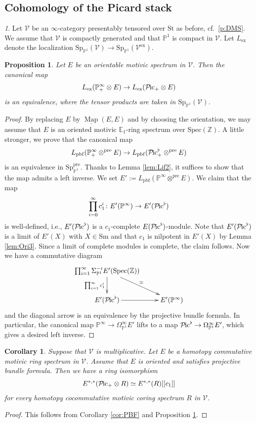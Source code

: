 \documentclass{amsart}
\theoremstyle{plain}
\newtheorem{proposition}[theorem]{Proposition}
\newtheorem{corollary}[theorem]{Corollary}
\theoremstyle{definition}
\theoremstyle{remark}
\newtheorem{p}[theorem]{}
\numberwithin{equation}{theorem}
\newcommand{\mbb}[1]{\mathbb{#1}}
\newcommand{\Sm}{\mathrm{Sm}}
\newcommand{\Spec}{\mathrm{Spec}}
\newcommand{\St}{\mathrm{St}}
\newcommand{\V}{\mathcal{V}}
\newcommand{\ex}{\mathrm{ex}}
\newcommand{\pbf}{\mathrm{pbf}}
\newcommand{\pre}{\mathrm{pre}}
\newcommand{\OmegaP}{\Omega_{\mathbb{P}^1}}
\newcommand{\SigmaP}{\Sigma_{\mathbb{P}^1}}
\newcommand{\SpP}{\mathrm{Sp}_{\mathbb{P}^1}}
\newcommand{\Pic}{{\mathcal{P}\mspace{-2.0mu}\mathrm{ic}}}
\newcommand{\Map}{\operatorname{Map}}
\newcommand{\intMap}{\underline{\Map}}
\begin{document}
\subsection{Cohomology of the Picard stack}\label{Pic}

\begin{p}
Let $\V$ be an $\infty$-category presentably tensored over $\St$ as before, cf.\ \ref{p:DMS}.
We assume that $\V$ is compactly generated and that $\mbb{P}^1$ is compact in $\V$. 
Let $L_\ex$ denote the localization $\SpP(\V)\to\SpP(\V^\ex)$.
\end{p}

\begin{proposition}\label{prop:Pic}
Let $E$ be an orientable motivic spectrum in $\V$.
Then the canonical map
\[
	L_\ex(\mbb{P}^\infty_+\otimes E) \to L_\ex(\Pic_+\otimes E)
\]
is an equivalence, where the tensor products are taken in $\SpP(\V)$.
\end{proposition}
\begin{proof}
By replacing $E$ by $\intMap(E,E)$ and by choosing the orientation, we may assume that $E$ is an oriented motivic $\mbb{E}_1$-ring spectrum over $\Spec(\mbb{Z})$.
A little stronger, we prove that the canonical map
\[
	L_\pbf(\mbb{P}^\infty_+\otimes^\pre E) \to L_\pbf(\Pic^\flat_+\otimes^\pre E)
\]
is an equivalence in $\SpP^\pre$.
Thanks to Lemma \ref{lem:Lif2}, it suffices to show that the map admits a left inverse.
We set $E':=L_\pbf(\mbb{P}^\infty\otimes^\pre E)$.
We claim that the map
\[
	\prod_{i=0}^\infty c_1^i \colon E'(\mbb{P}^\infty) \to E'(\Pic^\flat)
\]
is well-defined, i.e., $E'(\Pic^\flat)$ is a $c_1$-complete $E(\Pic^\flat)$-module.
Note that $E'(\Pic^\flat)$ is a limit of $E'(X)$ with $X\in\Sm$ and that $c_1$ is nilpotent in $E'(X)$ by Lemma \ref{lem:Ori3}.
Since a limit of complete modules is complete, the claim follows.
Now we have a commutative diagram 
\[
\xymatrix{
	\prod_{i=1}^\infty \SigmaP^{-i}E'(\Spec(\mbb{Z})) \ar[rd]^\simeq \ar[d]_{\prod_{i=1}^\infty c_1^i} & \\
	E'(\Pic^\flat) \ar[r] & E'(\mbb{P}^\infty)
}
\]
and the diagonal arrow is an equivalence by the projective bundle formula.
In particular, the canonical map $\mbb{P}^\infty\to\OmegaP^\infty E'$ lifts to a map $\Pic^\flat\to\OmegaP^\infty E'$, which gives a desired left inverse.
\end{proof}

\begin{corollary}\label{cor:Pic}
Suppose that $\V$ is multiplicative.
Let $E$ be a homotopy commutative motivic ring spectrum in $\V$.
Assume that $E$ is oriented and satisfies projective bundle formula.
Then we have a ring isomorphism
\[
	E^{*,*}(\Pic_+\otimes R) \simeq E^{*,*}(R)[[c_1]]
\]
for every homotopy cocommutative motivic coring spectrum $R$ in $\V$.
\end{corollary}
\begin{proof}
This follows from Corollary \ref{cor:PBF} and Proposition \ref{prop:Pic}.
\end{proof}
\end{document}
